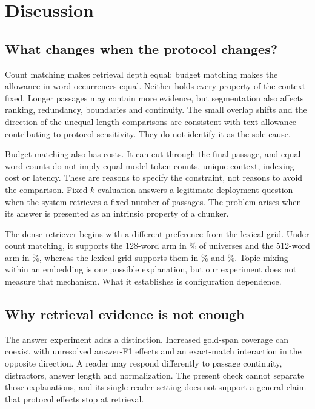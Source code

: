 \documentclass[11pt]{article}
\begin{document}
\section{Discussion}\label{sec:discussion}
\subsection{What changes when the protocol changes?}
Count matching makes retrieval depth equal; budget matching makes the allowance in word occurrences equal. Neither holds every property of the context fixed. Longer passages may contain more evidence, but segmentation also affects ranking, redundancy, boundaries and continuity. The small overlap shifts and the direction of the unequal-length comparisons are consistent with text allowance contributing to protocol sensitivity. They do not identify it as the sole cause.

Budget matching also has costs. It can cut through the final passage, and equal word counts do not imply equal model-token counts, unique context, indexing cost or latency. These are reasons to specify the constraint, not reasons to avoid the comparison. Fixed-$k$ evaluation answers a legitimate deployment question when the system retrieves a fixed number of passages. The problem arises when its answer is presented as an intrinsic property of a chunker.

The dense retriever begins with a different preference from the lexical grid. Under count matching, it supports the 128-word arm in \HFiveBCount\% of universes and the 512-word arm in \HFiveCountFiveTwelve\%, whereas the lexical grid supports them in \PoneCountOneTwoEight\% and \PoneCountFiveTwelve\%. Topic mixing within an embedding is one possible explanation, but our experiment does not measure that mechanism. What it establishes is configuration dependence.

\subsection{Why retrieval evidence is not enough}
The answer experiment adds a distinction. Increased gold-span coverage can coexist with unresolved answer-F1 effects and an exact-match interaction in the opposite direction. A reader may respond differently to passage continuity, distractors, answer length and normalization. The present check cannot separate those explanations, and its single-reader setting does not support a general claim that protocol effects stop at retrieval.
\end{document}
